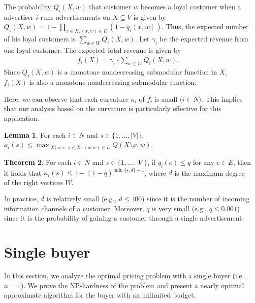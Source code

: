 \documentclass[letterpaper]{article}
\theoremstyle{definition}
\newtheorem{theorem}{Theorem}
\newtheorem{lemma}[theorem]{Lemma}
\begin{document}
The probability $Q_i(X,w)$ that customer $w$ becomes a loyal customer 
when a advertiser $i$ runs advertisements on $X \subseteq V$ is given by
$Q_i(X, w) = 1 - \prod_{x \in X, (x,w) \in E}(1 - q_i(x,w))$.
Thus, the expected number of his loyal customers is $\sum_{w \in W} Q_i(X, w)$.
Let $\gamma_i$ be the expected revenue from one loyal customer. 
The expected total revenue is given by 
\begin{align}\label{eq:fQ}
\textstyle
f_i(X)=\gamma_i \cdot \sum_{w \in W} Q_i(X, w).
\end{align}
Since $Q_i(X, w)$ is a monotone nondecreasing submodular function in $X$,
$f_i(X)$ is also a monotone nondecreasing submodular function.



Here, we can observe that each curvature $\kappa_i$ of $f_i$ is small ($i \in N$). 
This implies that our analysis based on the curvature is particularly effective for this application. 
\begin{lemma}
\label{lem:curvaturebound}
For each $i \in N$ and $s \in \{1, \ldots, |V|\}$,
$\kappa_i(s) \le \max_{|X| = s,~ x \in X,~ (x,w) \in E} Q(X \setminus x, w)$. 
\end{lemma}
\begin{theorem}
\label{thm:curvature}
For each $i \in N$ and $s \in \{1, \ldots, |V|\}$, 
if $q_i(e) \le q$ for any $e \in E$, then
it holds that $\kappa_i(s) \le 1 - (1 - q)^{\min\{s,d\} - 1}$,
where $d$ is the maximum degree of the right vertices $W$.
\end{theorem}
In practice, $d$ is relatively small (e.g., $d \le 100$) since it is the number of incoming information channels of a customer.
Moreover, $q$ is very small (e.g., $q \le 0.001$) since it is the probability of gaining a customer through a single advertisement.




\section{Single buyer}
\label{sec:single}

In this section, we analyze the optimal pricing problem with a single buyer (i.e., $n=1$). 
We prove the NP-hardness of the problem and present a nearly optimal approximate algorithm for the buyer with an unlimited budget. 
\end{document}
